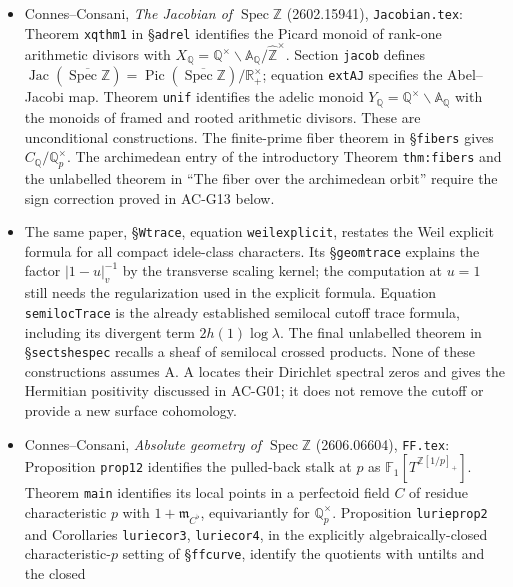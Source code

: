 \begin{itemize}
\item Connes--Consani, \emph{The Jacobian of $\operatorname{Spec}\mathbb Z$}
(2602.15941), \texttt{Jacobian.tex}: Theorem \texttt{xqthm1} in
\S\texttt{adrel} identifies the Picard monoid of rank-one arithmetic
divisors with
$X_{\mathbb Q}=\mathbb Q^\times\backslash\mathbb A_{\mathbb Q}/
\widehat{\mathbb Z}^{\times}$.  Section \texttt{jacob} defines
$\operatorname{Jac}(\overline{\operatorname{Spec}\mathbb Z})
=\operatorname{Pic}(\overline{\operatorname{Spec}\mathbb Z})/
\mathbb R_+^\times$; equation \texttt{extAJ} specifies the Abel--Jacobi
map.  Theorem \texttt{unif} identifies the adelic monoid
$Y_{\mathbb Q}=\mathbb Q^\times\backslash\mathbb A_{\mathbb Q}$ with
the monoids of framed and rooted arithmetic divisors.  These are
unconditional constructions.  The finite-prime fiber theorem in
\S\texttt{fibers} gives $C_{\mathbb Q}/\mathbb Q_p^\times$.
The archimedean entry of the introductory Theorem \texttt{thm:fibers}
and the unlabelled theorem in ``The fiber over the archimedean orbit''
require the sign correction proved in AC-G13 below.
\item The same paper, \S\texttt{Wtrace}, equation
\texttt{weilexplicit}, restates the Weil explicit formula for all
compact idele-class characters.  Its \S\texttt{geomtrace} explains the
factor $|1-u|_v^{-1}$ by the transverse scaling kernel; the computation
at $u=1$ still needs the regularization used in the explicit formula.
Equation \texttt{semilocTrace} is the already established semilocal
cutoff trace formula, including its divergent term
$2h(1)\log\lambda$.  The final unlabelled theorem in
\S\texttt{sectshespec} recalls a sheaf of semilocal crossed products.
None of these constructions assumes A.  A locates their Dirichlet
spectral zeros and gives the Hermitian positivity discussed in AC-G01;
it does not remove the cutoff or provide a new surface cohomology.
\item Connes--Consani, \emph{Absolute geometry of
$\operatorname{Spec}\mathbb Z$} (2606.06604), \texttt{FF.tex}:
Proposition \texttt{prop12} identifies the pulled-back stalk at $p$ as
$\mathbb F_1[T^{\mathbb Z[1/p]_+}]$.  Theorem \texttt{main} identifies
its local points in a perfectoid field $C$ of residue characteristic $p$
with $1+\mathfrak m_{C^\flat}$, equivariantly for
$\mathbb Q_p^\times$.  Proposition \texttt{lurieprop2} and Corollaries
\texttt{luriecor3}, \texttt{luriecor4}, in the explicitly
algebraically-closed characteristic-$p$ setting of
\S\texttt{ffcurve}, identify the quotients with untilts and the closed

\end{itemize}
